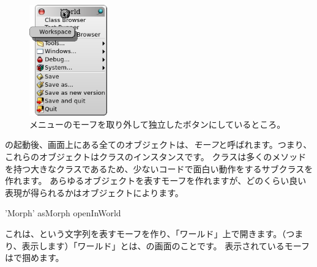 \documentclass[a4paper,10pt,twoside]{book}
\begin{document}

\begin{figure}[ht]
	\centerline{\includegraphics[width=0.3\textwidth]{detachingMenu}}
	\caption{メニューのモーフを取り外して独立したボタンにしているところ。
		}
\end{figure}

\pharo の起動後、画面上にある全てのオブジェクトは、\emph{モーフ}と呼ばれます。つまり、これらのオブジェクトはクラスのインスタンスです。
\mbox{}クラスは多くのメソッドを持つ大きなクラスであるため、少ないコードで面白い動作をするサブクラスを作れます。
あらゆるオブジェクトを表すモーフを作れますが、どのくらい良い表現が得られるかはオブジェクトによります。

\begin{code}{}
'Morph' asMorph openInWorld
\end{code}


これは、という文字列を表すモーフを作り、「ワールド」上で開きます。（つまり、表示します）「ワールド」とは、\pharo の画面のことです。
表示されているモーフは\metaclick で掴めます。
\end{document}
